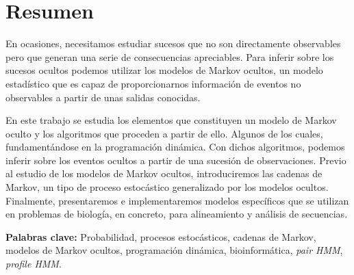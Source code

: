 \chapter*{Resumen}
En ocasiones, necesitamos estudiar sucesos que no son directamente observables pero que generan una serie de consecuencias apreciables. Para inferir sobre los sucesos ocultos podemos utilizar los modelos de Markov ocultos, un modelo estadístico que es capaz de proporcionarnos información de eventos no observables a partir de unas salidas conocidas. 

En este trabajo se estudia los elementos que constituyen un modelo de Markov oculto y los algoritmos que proceden a partir de ello. Algunos de los cuales, fundamentándose en la  programación dinámica. Con dichos algoritmos, podemos inferir sobre los eventos ocultos a partir de una sucesión de observaciones. Previo al estudio de los modelos de Markov ocultos, introduciremos las cadenas de Markov, un tipo de proceso estocástico generalizado por los modelos ocultos. Finalmente, presentaremos e implementaremos modelos específicos que se utilizan en problemas de biología, en concreto, para alineamiento y análisis de secuencias.

\textbf{Palabras clave: } Probabilidad, procesos estocásticos, cadenas de Markov, modelos de Markov ocultos, programación dinámica, bioinformática, \textit{pair HMM}, \textit{profile HMM}.